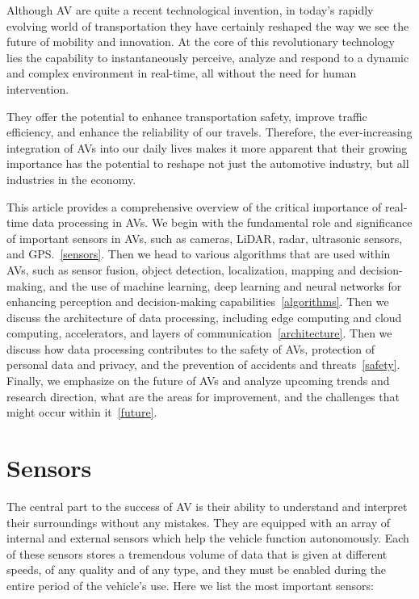 \documentclass[10pt,oneside,english,a4paper]{article}
\begin{document}
\indent Although AV are quite a recent technological invention, in today's rapidly evolving world of transportation they have certainly reshaped the way we see the future of mobility and innovation. At the core of this revolutionary technology lies the capability to instantaneously perceive, analyze and respond to a dynamic and complex environment in real-time, all without the need for human intervention. 
\par They offer the potential to enhance transportation safety, improve traffic efficiency, and enhance the reliability of our travels. Therefore, the ever-increasing integration of AVs into our daily lives makes it more apparent that their growing importance has the potential to reshape not just the automotive industry, but all industries in the economy. 
\par This article provides a comprehensive overview of the critical importance of real-time data processing in AVs. We begin with the fundamental role and significance of important sensors in AVs, such as cameras, LiDAR, radar, ultrasonic sensors, and GPS.~\eqref{sensors}. 
Then we head to various algorithms that are used within AVs, such as sensor fusion, object detection, localization, mapping and decision-making, and the use of machine learning, deep learning and neural networks for enhancing perception and decision-making capabilities~\eqref{algorithms}. Then we discuss the architecture of data processing, including edge computing and cloud computing, accelerators, and layers of communication~\eqref{architecture}. Then we discuss how data processing contributes to the safety of AVs, protection of personal data and privacy, and the prevention of accidents and threats~\eqref{safety}. Finally, we emphasize on the future of AVs and analyze upcoming trends and research direction, what are the areas for improvement, and the challenges that might occur within it~\eqref{future}.


\section{Sensors} \label{sensors}

\indent The central part to the success of AV is their ability to understand and interpret their surroundings without any mistakes. They are equipped with an array of internal and external sensors which help the vehicle function autonomously. Each of these sensors stores a tremendous volume of data that is given at different speeds, of any quality and of any type, and they must be enabled during the entire period of the vehicle's use. Here we list the most important sensors:
\end{document}
